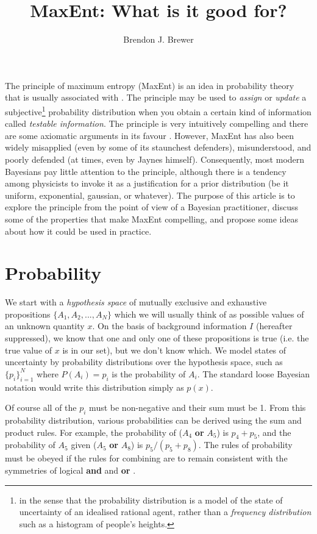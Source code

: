 \documentclass[letterpaper, 11pt]{article}
\title{MaxEnt: What is it good for?}
\author{Brendon J. Brewer}
\begin{document}
\maketitle

The principle of maximum entropy (MaxEnt) is an idea in probability theory
that is usually associated with \citet{jaynes}. The principle may be used
to {\it assign} or {\it update} a
subjective\footnote{in the sense that the probability distribution is a model
of the state of uncertainty of an idealised rational agent, rather than
a {\it frequency distribution} such as a histogram of people's heights.}
probability distribution when you obtain a certain kind of information
called {\it testable information}. The principle is very intuitively compelling
and there are some axiomatic arguments in its favour
\citep[e.g.][]{2010arXiv1008.4831K}. However, MaxEnt has also been widely
misapplied (even by some of its staunchest defenders), misunderstood,
and poorly defended (at times, even by Jaynes himself).
Consequently, most modern Bayesians pay little attention to the principle,
although there is a tendency among physicists to invoke it as a justification
for a prior distribution (be it uniform, exponential, gaussian, or whatever).
The purpose of this article is to explore the principle from the point of
view of a Bayesian practitioner, discuss some of the properties that
make MaxEnt compelling, and propose some ideas about how it could be used in
practice.

\section{Probability}
We start with a {\it hypothesis space} of mutually exclusive and
exhaustive propositions $\{A_1, A_2, ..., A_N\}$ which we will usually
think of as possible values of an unknown quantity $x$.
On the basis of background
information $I$ (hereafter suppressed), we know that one and only one of these
propositions is true (i.e. the true value of $x$ is in our set),
but we don't know which. We model states of
uncertainty by probability distributions over the hypothesis space,
such as $\{p_i\}_{i=1}^N$ where $P(A_i) = p_i$ is the probability of $A_i$.
The standard loose Bayesian notation would write this distribution simply
as $p(x)$.

Of course all of the $p_i$ must be non-negative and their sum must be 1.
From this probability distribution, various probabilities can be derived
using the sum and product rules. For example, the probability of
($A_4$ {\bf or} $A_5$) is $p_4 + p_5$, and the probability of $A_5$ given
($A_5$ {\bf or} $A_8$) is $p_5/(p_5 + p_8)$. The rules of probability must
be obeyed if the rules for combining are to remain consistent
with the symmetries of logical {\bf and} and {\bf or}
\citep{2010arXiv1008.4831K}.
\end{document}

